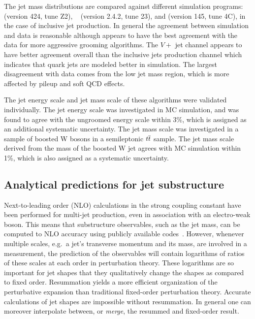 The jet mass distributions are compared against different simulation 
programs: \pythiasix~\cite{Sjostrand:2006za,Sjostrand:2007gs} 
(version 424, tune Z2), 
\hpp~\cite{Corcella:2000bw,Bahr:2008pv} 
(version 2.4.2, tune 23), and \pythiaeight 
(version 145, tune 4C), 
in the case of inclusive jet production.
In general the agreement between simulation and data is reasonable 
although \hpp appears to have the best agreement with the data
for more aggressive grooming algorithms. The $V + $ jet channel appears to 
have better agreement overall than the inclusive jets production 
channel which indicates 
that quark jets are modeled better in simulation.
The largest disagreement with data comes from the low jet mass region, 
which is more affected by pileup and soft QCD effects.

The jet energy scale and jet mass scale of these algorithms were validated
individually. The jet energy scale was investigated in MC simulation, and
was found to agree with the ungroomed energy scale within 3\%, which is
assigned as an additional systematic uncertainty.
The jet mass scale was investigated in a sample of boosted W bosons in a
semileptonic $t\overline{t}$ sample. The jet mass scale derived from the mass of the
boosted W jet agrees with MC simulation within 1\%, which is also assigned as
a systematic uncertainty.

\subsection{Analytical predictions for jet substructure}

Next-to-leading order (NLO) calculations in the strong coupling constant 
have been performed for multi-jet production, even in association with 
an electro-weak boson. This means that substructure observables, such 
as the jet mass, can be computed to NLO accuracy using 
publicly available codes~\cite{Campbell:2002tg,Nagy:2003tz}.
However, whenever multiple scales, e.g.\ a jet's transverse momentum and 
its mass, are involved in a measurement, the prediction of the observables will 
contain logarithms of ratios of these scales at each order 
in perturbation theory. These logarithms are so important for jet 
shapes that they qualitatively change the shapes as compared to fixed order.
Resummation yields a more efficient organization of the perturbative expansion 
than traditional fixed-order perturbation theory. Accurate calculations
of jet shapes are impossible without resummation. In general one can moreover
interpolate between, or {\it merge}, the resummed and fixed-order result. 

